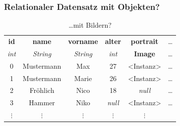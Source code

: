 \begin{frame}
    \frametitle{Relationaler Datensatz mit Objekten?}

    \begin{table}
        \centering
        \begin{adjustbox}{width=\textwidth}
            \small
            \begin{tabular}[c]{|c|c|c|c|c|c}

                \hline

                \multicolumn{1}{|c|}{\textbf{id}} &
                \multicolumn{1}{c|}{\textbf{name}} &
                \multicolumn{1}{c|}{\textbf{vorname}} &
                \multicolumn{1}{c|}{\textbf{alter}} &
                \multicolumn{1}{c|}{\textbf{portrait}} &
                \multicolumn{1}{c}{\dots} \\

                \multicolumn{1}{|c|}{\textit{int}} &
                \multicolumn{1}{c|}{\textit{String}} &
                \multicolumn{1}{c|}{\textit{String}} &
                \multicolumn{1}{c|}{\textit{int}} &
                \multicolumn{1}{c|}{\textbf{Image}} &
                \multicolumn{1}{c}{\dots} \\

                \hline

                0  & Mustermann  & Max    & 27             & <Instanz>      & \dots \\
                1  & Mustermann  & Marie  & 26             & <Instanz>      & \dots \\
                2  & Fröhlich    & Nico   & 18             & \textit{null}  & \dots \\
                3  & Hammer      & Niko   & \textit{null}  & <Instanz>     & \dots \\
                $\vdots$ & $\vdots$ & $\vdots$ & $\vdots$ & $\vdots$ &

            \end{tabular}
        \end{adjustbox}
        \caption{\dots mit Bildern?}
        \label{tab:erwachsene3}
    \end{table}

\end{frame}
